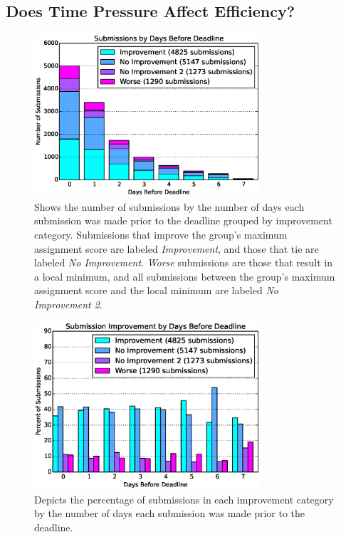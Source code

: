 \subsection{Does Time Pressure Affect Efficiency?}

\begin{figure}[!t]
\centering \includegraphics[width=3.3in]{graphs/Submissions_by_Days_Before_Deadline.eps}
\caption{Shows the number of submissions by the number of days each submission
  was made prior to the deadline grouped by improvement category.  Submissions
  that improve the group's maximum assignment score are labeled
  \emph{Improvement}, and those that tie are labeled \emph{No
    Improvement}. \emph{Worse} submissions are those that result in a local
  minimum, and all submissions between the group's maximum assignment score and
  the local minimum are labeled \emph{No Improvement 2}.}
\end{figure}

\begin{figure}[!t]
\centering
\includegraphics[width=3.3in]{graphs/Submission_Improvement_by_Days_Before_Deadline.eps}
\caption{Depicts the percentage of submissions in each improvement category by
  the number of days each submission was made prior to the deadline.}
\end{figure}


